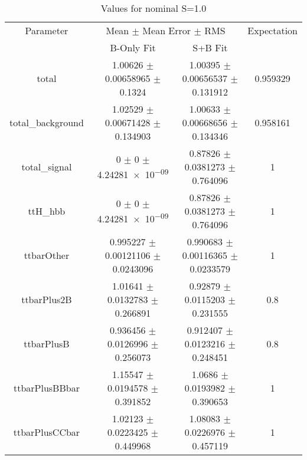 \begin{table}
\centering
\caption{Values for nominal S=1.0}
\begin{tabular}{cccc}
\toprule
Parameter & \multicolumn{2}{c}{Mean $\pm$ Mean Error $\pm$ RMS} & Expectation\\
 & B-Only Fit & S+B Fit & \\
\midrule
total & \num{1.00626} $\pm$ \num{0.00658965} $\pm$ \num{0.1324} & \num{1.00395} $\pm$ \num{0.00656537} $\pm$ \num{0.131912} & \num{0.959329}\\
total\_background & \num{1.02529} $\pm$ \num{0.00671428} $\pm$ \num{0.134903} & \num{1.00633} $\pm$ \num{0.00668656} $\pm$ \num{0.134346} & \num{0.958161}\\
total\_signal & \num{0} $\pm$ \num{0} $\pm$ \num{4.24281e-09} & \num{0.87826} $\pm$ \num{0.0381273} $\pm$ \num{0.764096} & \num{1}\\
ttH\_hbb & \num{0} $\pm$ \num{0} $\pm$ \num{4.24281e-09} & \num{0.87826} $\pm$ \num{0.0381273} $\pm$ \num{0.764096} & \num{1}\\
ttbarOther & \num{0.995227} $\pm$ \num{0.00121106} $\pm$ \num{0.0243096} & \num{0.990683} $\pm$ \num{0.00116365} $\pm$ \num{0.0233579} & \num{1}\\
ttbarPlus2B & \num{1.01641} $\pm$ \num{0.0132783} $\pm$ \num{0.266891} & \num{0.92879} $\pm$ \num{0.0115203} $\pm$ \num{0.231555} & \num{0.8}\\
ttbarPlusB & \num{0.936456} $\pm$ \num{0.0126996} $\pm$ \num{0.256073} & \num{0.912407} $\pm$ \num{0.0123216} $\pm$ \num{0.248451} & \num{0.8}\\
ttbarPlusBBbar & \num{1.15547} $\pm$ \num{0.0194578} $\pm$ \num{0.391852} & \num{1.0686} $\pm$ \num{0.0193982} $\pm$ \num{0.390653} & \num{1}\\
ttbarPlusCCbar & \num{1.02123} $\pm$ \num{0.0223425} $\pm$ \num{0.449968} & \num{1.08083} $\pm$ \num{0.0226976} $\pm$ \num{0.457119} & \num{1}\\
\bottomrule
\end{tabular}
\end{table}